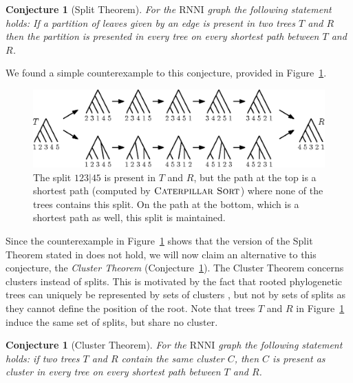 \documentclass{amsart}
\newcommand{\rnni}{\mathrm{RNNI}}
\newcommand{\csort}{\textsc{Caterpillar Sort}}
\newtheorem{conjecture}[definition]{Conjecture}
\begin{document}
\begin{conjecture}[Split Theorem]
For the $\rnni$ graph the following statement holds:
If a partition of leaves given by an edge is present in two trees $T$ and $R$ then the partition is presented in every tree on every shortest path between $T$ and $R$.
\label{conjecture:split_theorem}
\end{conjecture}

We found a simple counterexample to this conjecture, provided in Figure~\ref{fig:splitthm_counterexample}.

\begin{figure}[H]
\centering
\includegraphics[width=\textwidth]{splitthm_counterexample}
\vspace{12pt}
\caption{The split $123|45$ is present in $T$ and $R$, but the path at the top is a shortest path (computed by $\csort$) where none of the trees contains this split.
On the path at the bottom, which is a shortest path as well, this split is maintained.}
\label{fig:splitthm_counterexample}
\end{figure}

Since the counterexample in Figure~\ref{fig:splitthm_counterexample} shows that the version of the Split Theorem stated in \autocite{Gavryushkin2018-ol} does not hold, we will now claim an alternative to this conjecture, the \emph{Cluster Theorem} (Conjecture~\ref{conjecture:cluster_theorem}).
The Cluster Theorem concerns clusters instead of splits.
This is motivated by the fact that rooted phylogenetic trees can uniquely be represented by sets of clusters \autocite{Steel2016-ye}, but not by sets of splits as they cannot define the position of the root.
Note that trees $T$ and $R$ in Figure~\ref{fig:splitthm_counterexample} induce the same set of splits, but share no cluster.

\begin{conjecture}[Cluster Theorem]
For the $\rnni$ graph the following statement holds:
if two trees $T$ and $R$ contain the same cluster $C$, then $C$ is present as cluster in every tree on every shortest path between $T$ and $R$.
\label{conjecture:cluster_theorem}
\end{conjecture}
\end{document}
